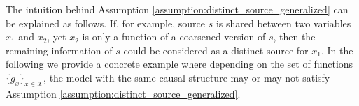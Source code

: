 \documentclass[12pt]{article}
\newcommand{\setX}{\mathcal{X}}
\begin{document}


The intuition behind Assumption \ref{assumption:distinct_source_generalized} can be explained as follows. If, for example, source $s$ is shared between two variables $x_1$ and $x_2$, yet $x_2$ is only a function of a coarsened version of $s$, then the remaining information of $s$ could be considered as a distinct source for $x_1$. In the following we provide a concrete example where depending on the set of functions $\{g_x\}_{x\in \setX}$, the model with the same causal structure may or may not satisfy Assumption \ref{assumption:distinct_source_generalized}.

\end{document}
